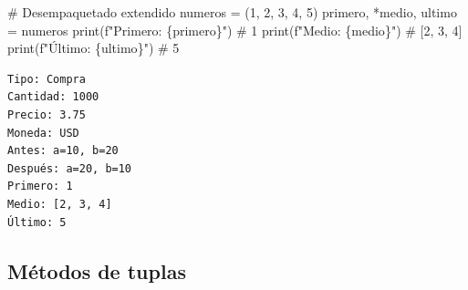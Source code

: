 \documentclass[
  doc,
  floatsintext,
  longtable,
  a4paper,
  nolmodern,
  notxfonts,
  notimes,
  12pt,
  colorlinks=true,linkcolor=blue,citecolor=blue,urlcolor=blue]{apa7}
\newenvironment{Shaded}{\begin{snugshade}}{\end{snugshade}}
\newcommand{\BuiltInTok}[1]{\textcolor[rgb]{0.00,0.23,0.31}{#1}}
\newcommand{\CommentTok}[1]{\textcolor[rgb]{0.37,0.37,0.37}{#1}}
\newcommand{\DecValTok}[1]{\textcolor[rgb]{0.68,0.00,0.00}{#1}}
\newcommand{\NormalTok}[1]{\textcolor[rgb]{0.00,0.23,0.31}{#1}}
\newcommand{\OperatorTok}[1]{\textcolor[rgb]{0.37,0.37,0.37}{#1}}
\newcommand{\SpecialCharTok}[1]{\textcolor[rgb]{0.37,0.37,0.37}{#1}}
\newcommand{\SpecialStringTok}[1]{\textcolor[rgb]{0.13,0.47,0.30}{#1}}
\begin{document}
\begin{Shaded}
\begin{Highlighting}[]
\CommentTok{\# Desempaquetado extendido}
\NormalTok{numeros }\OperatorTok{=}\NormalTok{ (}\DecValTok{1}\NormalTok{, }\DecValTok{2}\NormalTok{, }\DecValTok{3}\NormalTok{, }\DecValTok{4}\NormalTok{, }\DecValTok{5}\NormalTok{)}
\NormalTok{primero, }\OperatorTok{*}\NormalTok{medio, ultimo }\OperatorTok{=}\NormalTok{ numeros}
\BuiltInTok{print}\NormalTok{(}\SpecialStringTok{f"Primero: }\SpecialCharTok{\{}\NormalTok{primero}\SpecialCharTok{\}}\SpecialStringTok{"}\NormalTok{)    }\CommentTok{\# 1}
\BuiltInTok{print}\NormalTok{(}\SpecialStringTok{f"Medio: }\SpecialCharTok{\{}\NormalTok{medio}\SpecialCharTok{\}}\SpecialStringTok{"}\NormalTok{)        }\CommentTok{\# [2, 3, 4]}
\BuiltInTok{print}\NormalTok{(}\SpecialStringTok{f"Último: }\SpecialCharTok{\{}\NormalTok{ultimo}\SpecialCharTok{\}}\SpecialStringTok{"}\NormalTok{)      }\CommentTok{\# 5}
\end{Highlighting}
\end{Shaded}

\begin{verbatim}
Tipo: Compra
Cantidad: 1000
Precio: 3.75
Moneda: USD
Antes: a=10, b=20
Después: a=20, b=10
Primero: 1
Medio: [2, 3, 4]
Último: 5
\end{verbatim}

\subsection{Métodos de tuplas}\label{muxe9todos-de-tuplas}
\end{document}
